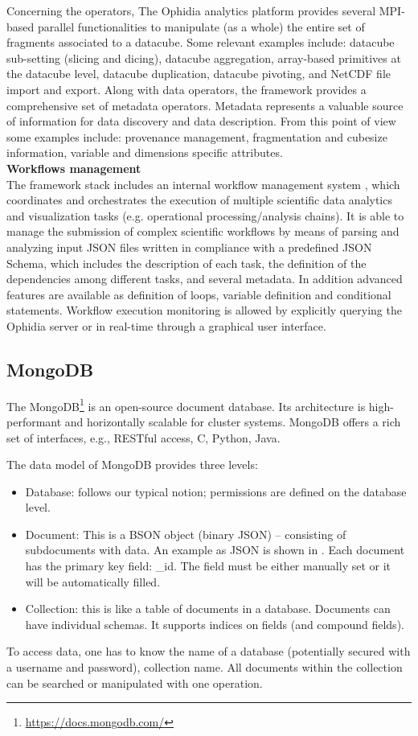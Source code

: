 Concerning the operators, The Ophidia analytics platform provides several MPI-based parallel functionalities to manipulate (as a whole) the entire set of fragments associated to a datacube. Some relevant examples include: datacube sub-setting (slicing and dicing), datacube aggregation, array-based primitives at the datacube level, datacube duplication, datacube pivoting, and NetCDF file import and export.
Along with data operators, the framework provides a comprehensive set of metadata operators. Metadata represents a valuable source of information for data discovery and data description. From this point of view some examples include: provenance management, fragmentation and cubesize information, variable and dimensions specific attributes.\\

\textbf{Workflows management}\\

The framework stack includes an internal workflow management system \cite{DBLP:conf/ieeehpcs/PalazzoMFDEWA15}, which coordinates and orchestrates the execution of multiple scientific data analytics and visualization tasks (e.g. operational processing/analysis chains). It is able to manage the submission of complex scientific workflows by means of parsing and analyzing input JSON files written in compliance with a predefined JSON Schema, which includes the description of each task, the definition of the dependencies among different tasks, and several metadata. In addition advanced features are available as definition of loops, variable definition and conditional statements. Workflow execution monitoring is allowed by explicitly querying the Ophidia server or in real-time through a graphical user interface.

\subsection{MongoDB}
The MongoDB\footnote{\url{https://docs.mongodb.com/}} is an open-source document database.
Its architecture is high-performant and horizontally scalable for cluster systems.
MongoDB offers a rich set of interfaces, e.g., RESTful access, C, Python, Java.

The data model of MongoDB provides three levels:
\begin{itemize}
  \item Database: follows our typical notion; permissions are defined on the database level.
  \item Document: This is a BSON object (binary JSON) -- consisting of subdocuments with data.
  An example as JSON is shown in .
  Each document has the primary key field: \_id. The field must be either manually set or it will be automatically filled.

  \item Collection: this is like a table of documents in a database. Documents can have individual schemas. It supports indices on fields (and compound fields).
\end{itemize}
To access data, one has to know the name of a database (potentially secured with a username and password), collection name. All documents within the collection can be searched or manipulated with one operation.

